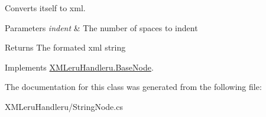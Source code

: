 Converts itself to xml. 


\begin{DoxyParams}{Parameters}
{\em indent} & The number of spaces to indent \\
\hline
\end{DoxyParams}
\begin{DoxyReturn}{Returns}
The formated xml string 
\end{DoxyReturn}


Implements \hyperlink{class_x_m_leru_handleru_1_1_base_node}{X\+M\+Leru\+Handleru.\+Base\+Node}.



The documentation for this class was generated from the following file\+:\begin{DoxyCompactItemize}
\item 
X\+M\+Leru\+Handleru/String\+Node.\+cs\end{DoxyCompactItemize}
